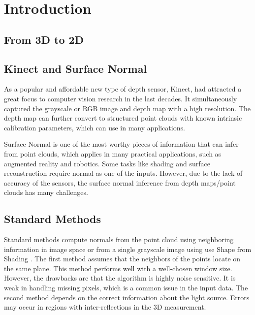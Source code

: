 
\chapter{Introduction} %

\label{ch:introduction} %


\section{From 3D to 2D}

\section{Kinect and Surface Normal}

As a popular and affordable new type of depth sensor, Kinect, had attracted a great focus to computer vision research in the last decades. It simultaneously captured the grayscale or RGB image and depth map with a high resolution. The depth map can further convert to structured point clouds with known intrinsic calibration parameters, which can use in many applications.

Surface Normal is one of the most worthy pieces of information that can infer from point clouds, which applies in many practical applications, such as augmented reality and robotics. Some tasks like shading and surface reconstruction require normal as one of the inputs. However, due to the lack of accuracy of the sensors, the  surface normal inference from depth maps/point clouds has many challenges.  


\section{Standard Methods}


Standard methods compute normals from the point cloud using neighboring information in image space or from a single grayscale image using use Shape from Shading \cite{SFS}. The first method assumes that the neighbors of the points locate on the same plane. This method performs well with a well-chosen window size. However, the drawbacks are that the algorithm is highly noise sensitive. It is weak in handling missing pixels, which is a common issue in the input data. The second method depends on the correct information about the light source. Errors may occur in regions with inter-reflections in the 3D measurement. 

